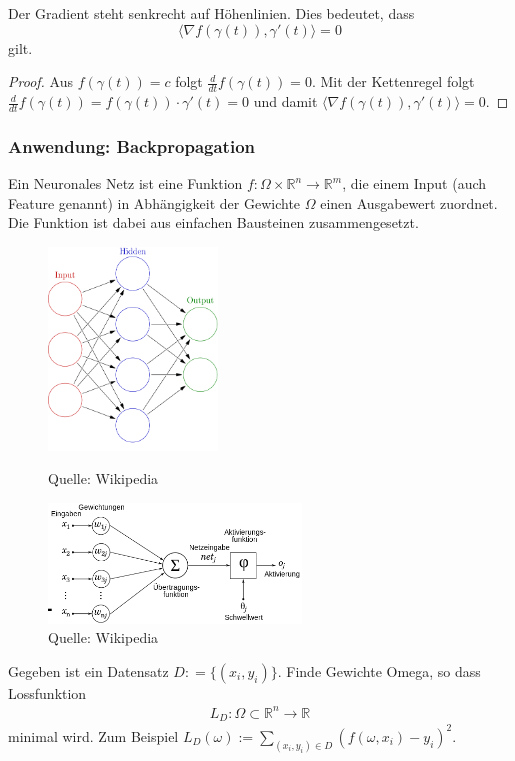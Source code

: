 \begin{Bemerkung}
Der Gradient steht senkrecht auf  Höhenlinien. Dies bedeutet, dass $$ \bigl \langle \nabla f(\gamma(t)), \gamma'(t) \bigr \rangle = 0$$ gilt. 
\end{Bemerkung}
\begin{proof}
Aus $f(\gamma(t)) = c$ folgt $\frac{d}{dt} f(\gamma(t)) = 0$. Mit der Kettenregel folgt $\frac{d}{dt} f(\gamma(t)) =  f(\gamma(t)) \cdot \gamma'(t) = 0$ und damit
$ \bigl \langle \nabla f(\gamma(t)), \gamma'(t) \bigr \rangle = 0$.
\end{proof}

\subsubsection*{Anwendung: Backpropagation}
Ein Neuronales Netz ist eine Funktion $f : \Omega \times \mathbb{R}^n \to \mathbb{R}^m$, die einem Input (auch Feature genannt) in Abhängigkeit der Gewichte $\Omega$
einen Ausgabewert zuordnet. Die Funktion ist dabei aus einfachen Bausteinen zusammengesetzt.

\begin{figure}[H]
      \centering
    \includegraphics[width=0.4\textwidth]{images/499px-Colored_neural_network}
      \caption{Quelle: Wikipedia}
    \includegraphics[width=0.6\textwidth]{images/500px-NeuronModel_deutsch}
      \caption{Quelle: Wikipedia}
\end{figure}


Gegeben ist ein  Datensatz $D : = \{ (x_i, y_i) \}$. Finde Gewichte Omega, so dass Lossfunktion
\begin{align*}
L_D  : \Omega \subset \mathbb{R}^n \to \mathbb{R} 
\end{align*}
minimal wird. Zum Beispiel $L_D(\omega) := \sum_{(x_i,y_i) \in D} (f(\omega, x_i) - y_i)^2$.

